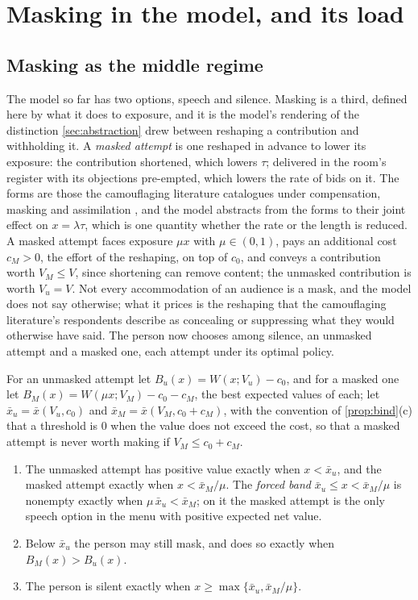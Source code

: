 \section{Masking in the model, and its load}\label{sec:masking}

\subsection{Masking as the middle regime}

The model so far has two options, speech and silence. Masking is a third, defined here by what it does to exposure, and it is the model's rendering of the distinction \autoref{sec:abstraction} drew between reshaping a contribution and withholding it. A \emph{masked attempt} is one reshaped in advance to lower its exposure: the contribution shortened, which lowers $\tau$; delivered in the room's register with its objections pre-empted, which lowers the rate of bids on it. The forms are those the camouflaging literature catalogues under compensation, masking and assimilation \cite{Hull2017, Hull2019, Livingston2019}, and the model abstracts from the forms to their joint effect on $x = \lambda\tau$, which is one quantity whether the rate or the length is reduced. A masked attempt faces exposure $\mu x$ with $\mu \in (0,1)$, pays an additional cost $c_M > 0$, the effort of the reshaping, on top of $c_0$, and conveys a contribution worth $V_M \le V$, since shortening can remove content; the unmasked contribution is worth $V_u = V$. Not every accommodation of an audience is a mask, and the model does not say otherwise; what it prices is the reshaping that the camouflaging literature's respondents describe as concealing or suppressing what they would otherwise have said. The person now chooses among silence, an unmasked attempt and a masked one, each attempt under its optimal policy.

\begin{proposition}\label{prop:band}
For an unmasked attempt let $B_u(x) = W(x; V_u) - c_0$, and for a masked one let $B_M(x) = W(\mu x; V_M) - c_0 - c_M$, the best expected values of each; let $\bar{x}_u = \bar{x}(V_u, c_0)$ and $\bar{x}_M = \bar{x}(V_M, c_0 + c_M)$, with the convention of \autoref{prop:bind}(c) that a threshold is $0$ when the value does not exceed the cost, so that a masked attempt is never worth making if $V_M \le c_0 + c_M$.
\begin{enumerate}[label=(\alph*)]
\item The unmasked attempt has positive value exactly when $x < \bar{x}_u$, and the masked attempt exactly when $x < \bar{x}_M/\mu$. The \emph{forced band} $\bar{x}_u \le x < \bar{x}_M/\mu$ is nonempty exactly when $\mu\,\bar{x}_u < \bar{x}_M$; on it the masked attempt is the only speech option in the menu with positive expected net value.
\item Below $\bar{x}_u$ the person may still mask, and does so exactly when $B_M(x) > B_u(x)$.
\item The person is silent exactly when $x \ge \max\{\bar{x}_u, \bar{x}_M/\mu\}$.
\end{enumerate}
\end{proposition}

